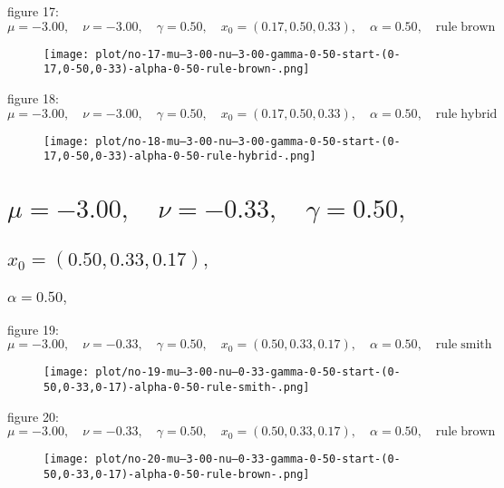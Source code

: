 \documentclass[a4paper]{article}
\begin{document}
\begin{multicols*}{2}
figure 17: \(\mu = -3.00,\quad \nu = -3.00,\quad \gamma = 0.50,\quad x_0 = (0.17,0.50,0.33),\quad \alpha = 0.50,\quad \mathrm{rule} \; \mathrm{brown}\)
   \begin{figure}[H]
   \centering
   \texttt{[image: plot/no-17-mu--3-00-nu--3-00-gamma-0-50-start-(0-17,0-50,0-33)-alpha-0-50-rule-brown-.png]}
   \end{figure}
   
figure 18: \(\mu = -3.00,\quad \nu = -3.00,\quad \gamma = 0.50,\quad x_0 = (0.17,0.50,0.33),\quad \alpha = 0.50,\quad \mathrm{rule} \; \mathrm{hybrid}\)
   \begin{figure}[H]
   \centering
   \texttt{[image: plot/no-18-mu--3-00-nu--3-00-gamma-0-50-start-(0-17,0-50,0-33)-alpha-0-50-rule-hybrid-.png]}
   \end{figure}
   

   \section{\(\mu = -3.00,\quad \nu = -0.33,\quad \gamma = 0.50,\quad \)}
   

   \subsection{\(x_0 = (0.50,0.33,0.17),\quad \)}
   

   \subsubsection{\(\alpha = 0.50,\quad \)}
   
figure 19: \(\mu = -3.00,\quad \nu = -0.33,\quad \gamma = 0.50,\quad x_0 = (0.50,0.33,0.17),\quad \alpha = 0.50,\quad \mathrm{rule} \; \mathrm{smith}\)
   \begin{figure}[H]
   \centering
   \texttt{[image: plot/no-19-mu--3-00-nu--0-33-gamma-0-50-start-(0-50,0-33,0-17)-alpha-0-50-rule-smith-.png]}
   \end{figure}
   
figure 20: \(\mu = -3.00,\quad \nu = -0.33,\quad \gamma = 0.50,\quad x_0 = (0.50,0.33,0.17),\quad \alpha = 0.50,\quad \mathrm{rule} \; \mathrm{brown}\)
   \begin{figure}[H]
   \centering
   \texttt{[image: plot/no-20-mu--3-00-nu--0-33-gamma-0-50-start-(0-50,0-33,0-17)-alpha-0-50-rule-brown-.png]}
   \end{figure}
   

\end{multicols*}
\end{document}
